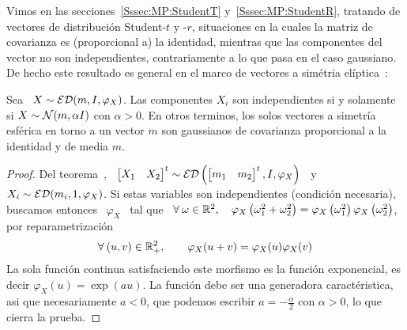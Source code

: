 Vimos   en   las  secciones~\ref{Sssec:MP:StudentT}   y~\ref{Sssec:MP:StudentR},
tratando de  vectores de  distribuci\'on Student-$t$ y  -$r$, situaciones  en la
cuales la  matriz de covarianza es  (proporcional a) la  identidad, mientras que
las componentes del  vector no son independientes, contrariamente  a lo que pasa
en  el caso  gaussiano.   De hecho  este resultado  es  general en  el marco  de
vectores a sim\'etria el\'iptica~\cite{BilBre99, Max67}:
%
\begin{teorema}
\label{Teo:MP:MaxwellHershell}
%
  Sea \ $X \sim \mathcal{ED}(m,I,\varphi_X)$. Las componentes $X_i$ son independientes si
  y solamente si $X  \sim \mathcal{N}(m, \alpha I)$ con $\alpha >  0$. En otros terminos,
  los  solos vectores  a simetr\'ia  esf\'erica  en torno  a un  vector $m$  son
  gaussianos de covarianza proporcional a la identidad y de media $m$.
\end{teorema}
%
\begin{proof}
  Del teorema~\cite{Teo:MP:TranformacionAfinEliptica},  \ $\begin{bmatrix} X_1 &
    X_2    \end{bmatrix}^t     \sim    \mathcal{ED}\left(    \begin{bmatrix}     m_1    &
      m_2 \end{bmatrix}^t, I, \varphi_X \right)$ \ y  \ $X_i \sim \mathcal{ED}( m_i , 1 ,
  \varphi_X)$.  Si  estas variables son  independientes (condici\'on necesaria),
  buscamos entonces  \ $\varphi_X$ \ tal  que \ $\forall \:  \omega \in \mathbb{R}^2,
  \quad  \varphi_X\left(  \omega_1^2  +  \omega_2^2  \right)  =  \varphi_X\left(
    \omega_1^2   \right)   \varphi_X\left(    \omega_2^2   \right)$,   \ie   por
  reparametrizaci\'on
  \[
  \forall  \:   (u,v)  \in  \mathbb{R}_+^2,  \qquad   \varphi_X(u+v)  =  \varphi_X(u)
  \varphi_X(v)
  \]
  La  sola  funci\'on  continua  satisfaciendo  este morfismo  es  la  funci\'on
  exponencial, es decir  $\varphi_X(u) = \exp(a u)$.  La  funci\'on debe ser una
  generadora  caract\'eristica, asi  que  necesariamente $a  <  0$, que  podemos
  escribir $a = - \frac{\alpha}{2}$ con $\alpha > 0$, lo que cierra la prueba.
\end{proof}

